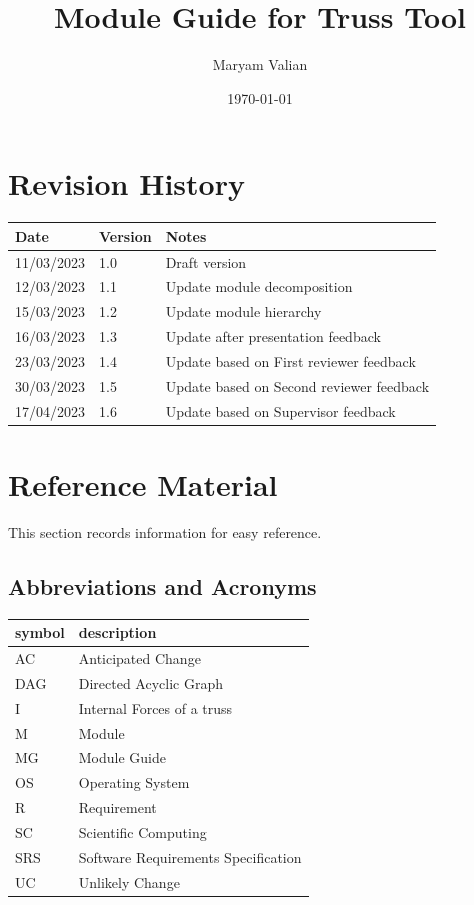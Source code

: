 \documentclass[12pt, titlepage]{article}
\begin{document}
\title{Module Guide for Truss Tool} 
\author{Maryam Valian}
\date{\today}

\maketitle


\section{Revision History}

\begin{tabularx}{\textwidth}{p{3cm}p{2cm}X}
\toprule {\bf Date} & {\bf Version} & {\bf Notes}\\
\midrule
11/03/2023 & 1.0 & Draft version\\
12/03/2023 & 1.1 & Update module decomposition\\
15/03/2023 &1.2 & Update module hierarchy\\
16/03/2023 &1.3 & Update after presentation feedback\\
23/03/2023 &1.4 & Update based on First reviewer feedback\\
30/03/2023 &1.5 & Update based on Second reviewer feedback\\
17/04/2023&1.6& Update based on Supervisor feedback\\
\bottomrule
\end{tabularx}

\newpage

\section{Reference Material}

This section records information for easy reference.

\subsection{Abbreviations and Acronyms}

\renewcommand{\arraystretch}{1.2}
\begin{tabular}{l l} 
  \toprule		
  \textbf{symbol} & \textbf{description}\\
  \midrule 
  AC & Anticipated Change\\
  DAG & Directed Acyclic Graph \\
  I & Internal Forces of a truss\\
  M & Module \\
  MG & Module Guide \\
  OS & Operating System \\
  R & Requirement\\
  SC & Scientific Computing \\
  SRS & Software Requirements Specification\\
  
  UC & Unlikely Change \\
  
  \bottomrule
\end{tabular}\\
\end{document}
